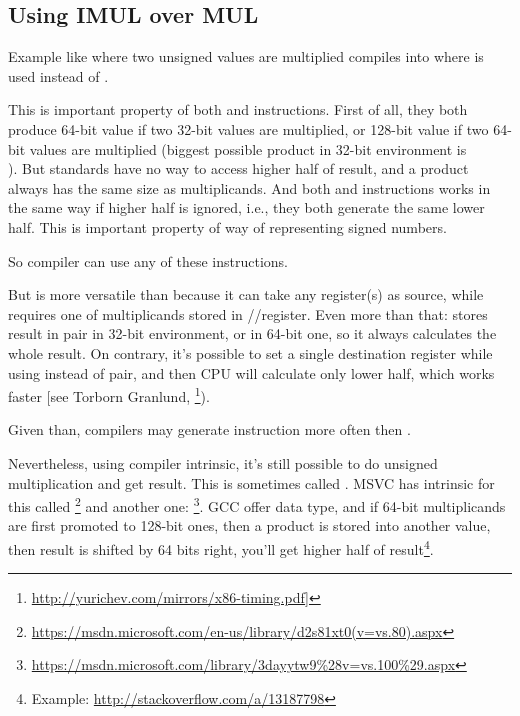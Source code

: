 \subsection{Using IMUL over MUL}
\label{IMUL_over_MUL}

Example like  where two unsigned values are multiplied compiles into  where \IMUL is used instead of \MUL.

This is important property of both \MUL and \IMUL instructions.
First of all, they both produce 64-bit value if two 32-bit values are multiplied, or 128-bit value if two 64-bit values are multiplied (biggest possible \gls{product} in 32-bit environment is \\
).
But \CCpp standards have no way to access higher half of result, and a \gls{product} always has the same size as multiplicands. %
And both \MUL and \IMUL instructions works in the same way if higher half is ignored, i.e., they both generate
the same lower half.
This is important property of  way of representing signed numbers.

So \CCpp compiler can use any of these instructions.

But \IMUL is more versatile than \MUL because it can take any register(s) as source, while \MUL requires one of multiplicands stored in \AX/\EAX/\RAX register.
Even more than that: \MUL stores result in  pair in 32-bit environment, or  in 64-bit one, so it always calculates the whole result.
On contrary, it's possible to set a single destination register while using \IMUL instead of pair, and then \ac{CPU} will calculate only lower half, which works faster [see Torborn Granlund, \footnote{\url{http://yurichev.com/mirrors/x86-timing.pdf}]}).

Given than, \CCpp compilers may generate \IMUL instruction more often then \MUL.

Nevertheless, using compiler intrinsic, it's still possible to do unsigned multiplication and get  result.
This is sometimes called .
MSVC has intrinsic for this called \footnote{\url{https://msdn.microsoft.com/en-us/library/d2s81xt0(v=vs.80).aspx}} and another one: \footnote{\url{https://msdn.microsoft.com/library/3dayytw9%28v=vs.100%29.aspx}}.
GCC offer  data type, and if 64-bit multiplicands are first promoted to 128-bit ones,
then a \gls{product} is stored into another  value, then result is shifted by 64 bits right,
you'll get higher half of result\footnote{Example: \url{http://stackoverflow.com/a/13187798}}.

